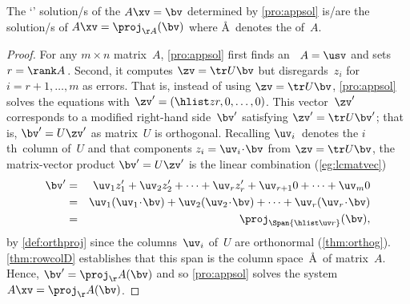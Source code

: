 \begin{theorem}[] \label{thm:lsqproj}
The `' solution/s of the  \(A\xv=\bv\) determined by \autoref{pro:appsol} is/are the solution/s of \(A\xv=\proj_{\AA}(\bv)\) where \AA~denotes the  of~\(A\).
\end{theorem}

\begin{proof} 
For any \(m\times n\) matrix~\(A\), \autoref{pro:appsol} first finds an \svd\ \(A=\usv\) and sets \(r=\rank A\)\,.
Second, it computes \(\zv=\tr U\bv\) but disregards~\(z_i\) for \(i=r+1,\ldots,m\) as errors.
That is, instead of using \(\zv=\tr U\bv\), \autoref{pro:appsol} solves the equations with \(\zv'=(\hlist zr,0,\ldots,0)\). 
This vector~\(\zv'\) corresponds to a modified right-hand side~\(\bv'\) satisfying \(\zv'=\tr U\bv'\); that is, \(\bv'=U\zv'\) as matrix~\(U\) is orthogonal.
Recalling \(\uv_i\)~denotes the \(i\)th~column of~\(U\) and that components \(z_i=\uv_i\cdot\bv\) from  \(\zv=\tr U\bv\),
the matrix-vector product \(\bv'=U\zv'\) is the linear combination (\autoref{eg:lcmatvec})
\begin{eqnarray*}
\bv'&=&\uv_1z'_1+\uv_2z'_2+\cdots+\uv_rz'_r+\uv_{r+1}0+\cdots+\uv_m0
\\&=&\uv_1(\uv_1\cdot\bv)+\uv_2(\uv_2\cdot\bv)+\cdots+\uv_r(\uv_r\cdot\bv)
\\&=&\proj_{\Span\{\hlist\uv r\}}(\bv),
\end{eqnarray*}
by \autoref{def:orthproj} since the columns~\(\uv_i\) of~\(U\) are orthonormal (\autoref{thm:orthog}).
\autoref{thm:rowcolD} establishes that this span is the column space~\AA\ of matrix~\(A\).
Hence, \(\bv'=\proj_\AA(\bv)\) and so \autoref{pro:appsol} solves the system \(A\xv=\proj_\AA(\bv)\).
\end{proof}


